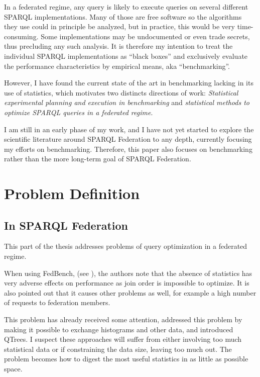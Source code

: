 \documentclass{llncs}
\begin{document}
In a federated regime, any query is likely to execute queries on
several different SPARQL implementations. Many of those are free
software so the algorithms they use could in principle be analyzed,
but in practice, this would be very time-consuming. Some
implementations may be undocumented or even trade secrets, thus
precluding any such analysis. It is therefore my intention to treat
the individual SPARQL implementations as ``black boxes'' and
exclusively evaluate the performance characteristics by empirical
means, aka ``benchmarking''.

However, I have found the current state of the art in benchmarking
lacking in its use of statistics, which motivates two distincts
directions of work: \emph{Statistical experimental planning and execution in
benchmarking} and \emph{statistical methods to optimize SPARQL queries
in a federated regime}.

I am still in an early phase of my work, and I have not yet started to
explore the scientific literature around SPARQL Federation to any
depth, currently focusing my efforts on benchmarking. Therefore, this
paper also focuses on benchmarking rather than the more long-term goal
of SPARQL Federation.

\section{Problem Definition}

\subsection{In SPARQL Federation}

This part of the thesis addresses problems of query optimization in a
federated regime.

When using FedBench, (see \cite{Schmidt:2011:FBS:2063016.2063054}),
the authors note that the absence of statistics has very adverse
effects on performance as join order is impossible to optimize. It is
also pointed out that it causes other problems as well, for example a
high number of requests to federation members. 

This problem has already received some attention, \cite{5337556}
addressed this problem by making it possible to exchange histograms
and other data, and \cite{Harth:2010:DSO:1772690.1772733} introduced
QTrees. I suspect these approaches will suffer from either involving
too much statistical data or if constraining the data size, leaving
too much out. The problem becomes how to digest the most useful
statistics in as little as possible space.
\end{document}
